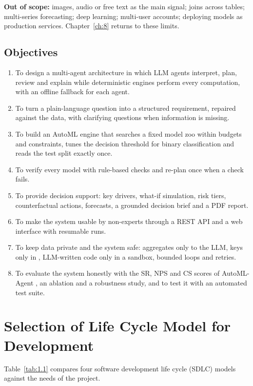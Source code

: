 \textbf{Out of scope:} images, audio or free text as the main signal; joins across tables; multi-series forecasting; deep learning; multi-user accounts; deploying models as production services. Chapter~\ref{ch:8} returns to these limits.

\subsection{Objectives}\label{sec:1.3.2}

\begin{enumerate}
  \item To design a multi-agent architecture in which LLM agents interpret, plan, review and explain while deterministic engines perform every computation, with an offline fallback for each agent.
  \item To turn a plain-language question into a structured requirement, repaired against the data, with clarifying questions when information is missing.
  \item To build an AutoML engine that searches a fixed model zoo within budgets and constraints, tunes the decision threshold for binary classification and reads the test split exactly once.
  \item To verify every model with rule-based checks and re-plan once when a check fails.
  \item To provide decision support: key drivers, what-if simulation, risk tiers, counterfactual actions, forecasts, a grounded decision brief and a PDF report.
  \item To make the system usable by non-experts through a REST API and a web interface with resumable runs.
  \item To keep data private and the system safe: aggregates only to the LLM, keys only in , LLM-written code only in a sandbox, bounded loops and retries.
  \item To evaluate the system honestly with the SR, NPS and CS scores of AutoML-Agent \cite{ref9}, an ablation and a robustness study, and to test it with an automated test suite.
\end{enumerate}

\FloatBarrier
\section{Selection of Life Cycle Model for Development}\label{sec:1.4}

Table~\ref{tab:1.1} compares four software development life cycle (SDLC) models against the needs of the project.

